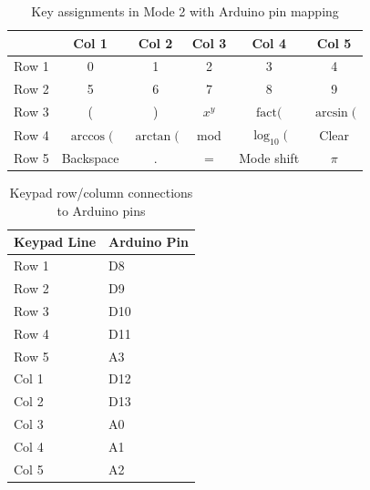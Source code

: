 \documentclass[conference]{IEEEtran}
\begin{document}
\begin{table}[h!]\centering
\caption{Key assignments in Mode 2 with Arduino pin mapping}
\renewcommand{\arraystretch}{1.3}
\begin{tabular}{c|c|c|c|c|c}
\toprule
      & Col 1 & Col 2 & Col 3 & Col 4 & Col 5 \\
\midrule
Row 1  & 0 & 1 & 2 & 3 & 4 \\
Row 2  & 5 & 6 & 7 & 8 & 9 \\
Row 3  & ( & ) & $x^{y}$ & $\text{fact}($ & $\arcsin($ \\
Row 4  & $\arccos($ & $\arctan($ & mod & $\log_{10}($ & Clear \\
Row 5  & Backspace & . & = & Mode shift& $\pi$ \\
\bottomrule
\end{tabular}
\end{table}
\begin{table}[H]
\centering
\caption{Keypad row/column connections to Arduino pins}
\label{tab:keypad}
\renewcommand{\arraystretch}{1.2}
\begin{tabular}{ll}
\toprule
\textbf{Keypad Line} & \textbf{Arduino Pin} \\
\midrule
Row 1 & D8 \\
Row 2 & D9 \\
Row 3 & D10 \\
Row 4 & D11 \\
Row 5 & A3 \\
Col 1 & D12 \\
Col 2 & D13 \\
Col 3 & A0 \\
Col 4 & A1 \\
Col 5 & A2 \\
\bottomrule
\end{tabular}
\end{table}
\end{document}
